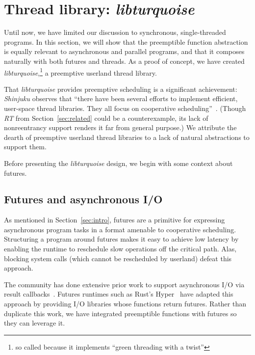 \section{Thread library: \textit{libturquoise}}
\label{sec:libturquoise}

Until now, we have limited our discussion to synchronous, single-threaded programs.
In this section, we will show that the preemptible function abstraction is equally
relevant to asynchronous and parallel programs, and that it composes naturally with
both futures and threads.  As a proof of concept, we have created
\textit{libturquoise},\footnote{so called because it implements ``green threading
with a twist''} a preemptive userland thread library.

That \textit{libturquoise} provides preemptive scheduling is a significant
achievement:\@
\textit{Shinjuku} observes that ``there have been several efforts to implement
efficient, user-space thread libraries.  They all focus on cooperative
scheduling''~\cite{Kaffes:nsdi2019}.  (Though \textit{RT} from
Section~\ref{sec:related} could be a counterexample, its lack of nonreentrancy
support renders it far from general purpose.)  We attribute the dearth of preemptive
userland thread libraries to a lack of natural abstractions to support them.

Before presenting the \textit{libturquoise} design, we begin with some context about
futures.


\subsection{Futures and asynchronous I/O}

As mentioned in Section~\ref{sec:intro}, futures are a primitive for expressing
asynchronous program tasks in a format amenable to cooperative scheduling.
Structuring a program around futures makes it easy to achieve low latency by enabling
the runtime to reschedule slow operations off the critical path.  Alas, blocking
system calls (which cannot be rescheduled by userland) defeat this approach.

The community has done extensive prior work to support asynchronous I/O via result
callbacks~\cite{www-libevent, www-libev, www-libuv, www-mordor}.  Futures runtimes
such as Rust's Hyper~\cite{www-hyper} have adapted this approach by providing I/O
libraries whose functions return futures.  Rather than duplicate this work, we have
integrated preemptible functions with futures so they can leverage it.


